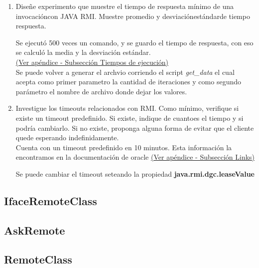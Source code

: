 \documentclass[12pt,journal,compsoc]{IEEEtran}
\begin{document}
\begin{enumerate}[label=\alph* -]
  \item Diseñe experimento que muestre el tiempo de respuesta mínimo de
  una invocacióncon JAVA RMI. Muestre promedio y desviaciónestándarde
  tiempo respuesta.

  Se ejecutó 500 veces un comando, y se guardo el tiempo de respuesta,
  con eso se calculó la media y la desviación estándar.\\

  \hyperref[section:times]{(Ver apéndice - Subsección Tiempos de ejecución)} \\

  Se puede volver a generar el archvio corriendo el script \textit{get\_data}
  el cual acepta como primer parametro la cantidad de iteraciones y como
  segundo parámetro el nombre de archivo donde dejar los valores.\\

  \item Investigue los timeouts relacionados con RMI. Como mínimo,
  verifique si existe un timeout predefinido. Si existe, indique de
  cuantoes el tiempo y si podría cambiarlo. Si no existe, proponga alguna
  forma de evitar que el cliente quede esperando indefinidamente.\\

  Cuenta con un timeout predefinido en 10 minutos. Esta información la
  encontramos en la documentación de oracle
  \hyperref[section:links]{(Ver apéndice - Subsección Links)}

  Se puede cambiar el timeout seteando la propiedad
  \textbf{java.rmi.dgc.leaseValue}

\end{enumerate}

\newpage
\onecolumn
{}
\label{appendix:codigo-java}

\subsection{IfaceRemoteClass}
\label{section:IfaceRemoteClass}


\subsection{AskRemote}
\label{section:AskRemote}


\subsection{RemoteClass}
\label{section:RemoteClass}

\end{document}
